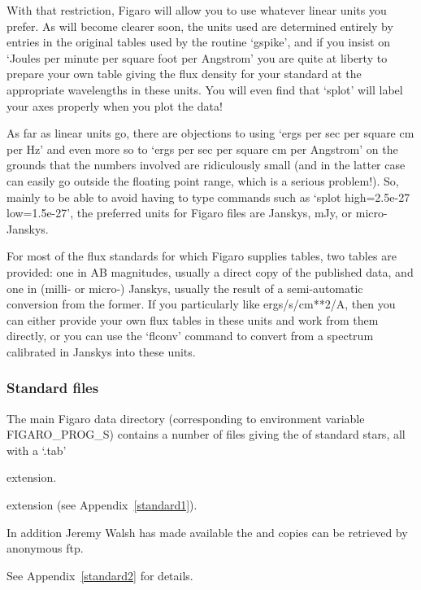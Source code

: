    With that restriction, Figaro will allow you to use whatever linear
   units you prefer.  As will become clearer soon, the units used are
   determined entirely by entries in the original tables used by the
   routine `gspike', and if you insist on `Joules per minute per square
   foot per Angstrom' you are quite at liberty to prepare your own table
   giving the flux density for your standard at the appropriate
   wavelengths in these units.  You will even find that `splot' will
   label your axes properly when you plot the data!


   As far as linear units go, there are objections to using `ergs per
   sec per square cm per Hz' and even more so to `ergs per sec per
   square cm per Angstrom' on the grounds that the numbers involved are
   ridiculously small (and in the latter case can easily go outside the
   floating point range, which is a serious problem!).  So, mainly to be
   able to avoid having to type commands such as `splot high=2.5e-27
   low=1.5e-27', the preferred units for Figaro files are Janskys, mJy,
   or micro-Janskys.


   For most of the flux standards for which Figaro supplies tables, two
   tables are provided: one in AB magnitudes, usually a direct copy of
   the published data, and one in (milli- or micro-) Janskys, usually
   the result of a semi-automatic conversion from the former.  If you
   particularly like ergs/s/cm**2/A, then you can either provide your
   own flux tables in these units and work from them directly, or you
   can use the `flconv' command to convert from a spectrum calibrated in
   Janskys into these units.


\subsubsection{\label{techno5standard}Standard files}

   The main Figaro data directory (corresponding to environment variable
   FIGARO\_PROG\_S) contains a number of files giving the
   of standard stars, all with a `.tab' 
\begin{htmlonly}
   extension.
\end{htmlonly}
\begin{latexonly}
   extension (see Appendix~\ref{standard1}).
\end{latexonly}
   In addition  Jeremy Walsh has made available the 
 and copies can be
   retrieved by anonymous ftp.  
\begin{latexonly}
See Appendix~\ref{standard2} for details.
\end{latexonly}

